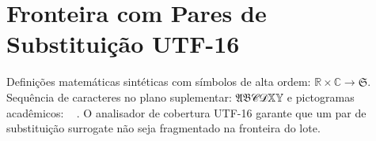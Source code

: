 \documentclass{article}
\begin{document}
\section{Fronteira com Pares de Substituição UTF-16}
Definições matemáticas sintéticas com símbolos de alta ordem:
$\mathbb{R} \times \mathbb{C} \rightarrow \mathfrak{S}$.
Sequência de caracteres no plano suplementar: 𝔄𝔅𝒞𝒟𝕏𝕐 e pictogramas acadêmicos: 🔬📘🧪.
O analisador de cobertura UTF-16 garante que um par de substituição surrogate não seja fragmentado na fronteira do lote.
\end{document}
